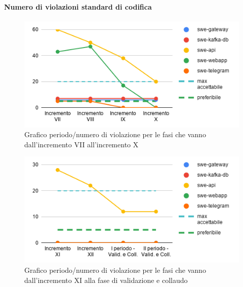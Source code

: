 \paragraph{Numero di violazioni standard di codifica}
	\begin{figure}[H]
			\centering
			\includegraphics[width=0.8\linewidth]{./res/images/QM-PROD-16-NVSC.png}
			\caption{Grafico periodo/numero di violazione per le fasi che vanno dall'incremento VII all'incremento X}
			\label{fig:Grafico periodo/numero di violazione per le fasi che vanno dall'incremento VII all'incremento X}
	\end{figure}
	\begin{figure}[H]
			\centering
			\includegraphics[width=0.8\linewidth]{./res/images/QM-PROD-16-NVSC_1.png}
			\caption{Grafico periodo/numero di violazione per le fasi che vanno dall'incremento XI alla fase di validazione e collaudo}
			\label{fig:Grafico periodo/numero di violazione per le fasi che vanno dall'incremento XI alla fase di validazione e collaudo}
	\end{figure}

